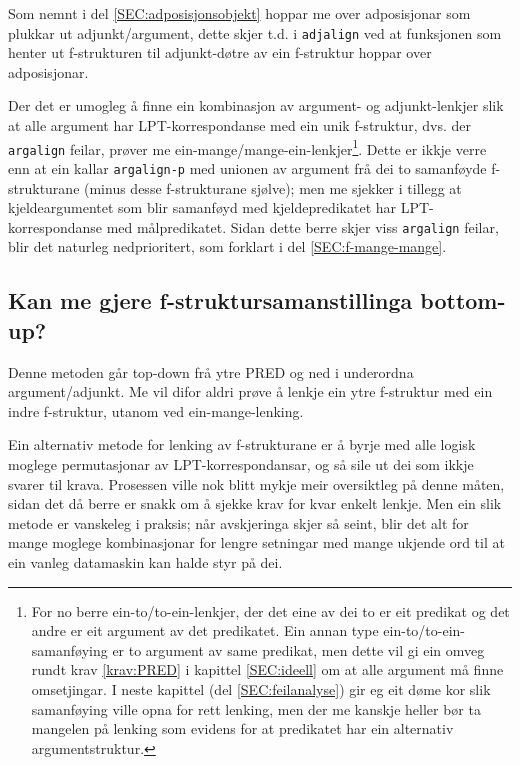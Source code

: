 \documentclass[12pt,a4paper,oneside,draft]{report}
\begin{document}
Som nemnt i del \ref{SEC:adposisjonsobjekt} hoppar me over
 adposisjonar som plukkar ut adjunkt/argument, dette skjer t.d. i
 \texttt{adjalign} ved at funksjonen som henter ut f\hyp{}strukturen til
 adjunkt-døtre av ein f\hyp{}struktur hoppar over adposisjonar.

Der det er umogleg å finne ein kombinasjon av argument- og
 adjunkt-lenkjer slik at alle argument har LPT\hyp{}korrespondanse med ein
 unik f\hyp{}struktur, dvs. der \texttt{argalign} feilar, prøver me
 ein-mange/mange-ein-lenkjer\footnote{For no berre ein-to/to-ein-lenkjer, der det eine av dei to er
        eit predikat og det andre er eit argument av det
        predikatet. Ein annan type ein-to/to-ein-samanføying er to
        argument av same predikat, men dette vil gi ein omveg rundt
        krav \ref{krav:PRED} i kapittel \ref{SEC:ideell} om at alle
        argument må finne omsetjingar. I neste kapittel (del
        \ref{SEC:feilanalyse}) gir eg eit døme kor slik samanføying
        ville opna for rett lenking, men der me kanskje heller bør ta
        mangelen på lenking som evidens for at predikatet har ein
        alternativ argumentstruktur. }. Dette er ikkje verre enn at ein
 kallar \texttt{argalign-p} med unionen av argument frå dei to samanføyde
 f\hyp{}strukturane (minus desse f\hyp{}strukturane sjølve); men me sjekker i
 tillegg at kjeldeargumentet som blir samanføyd med kjeldepredikatet
 har LPT\hyp{}korrespondanse med målpredikatet. Sidan dette berre skjer
 viss \texttt{argalign} feilar, blir det naturleg nedprioritert, som forklart
 i del \ref{SEC:f-mange-mange}.

\subsection{Kan me gjere f\hyp{}struktursamanstillinga bottom-up?}
\label{sec-4.1.3}


Denne metoden går top-down frå ytre PRED og ned i underordna
 argument/adjunkt. Me vil difor aldri prøve å lenkje ein ytre
 f\hyp{}struktur med ein indre f\hyp{}struktur, utanom ved ein-mange-lenking.

Ein alternativ metode for lenking av f\hyp{}strukturane er å byrje med
 alle logisk moglege permutasjonar av LPT\hyp{}korrespondansar, og så sile
 ut dei som ikkje svarer til krava. Prosessen ville nok blitt mykje
 meir oversiktleg på denne måten, sidan det då berre er snakk om å
 sjekke krav for kvar enkelt lenkje.  Men ein slik metode er vanskeleg
 i praksis; når avskjeringa skjer så seint, blir det alt for mange
 moglege kombinasjonar for lengre setningar med mange ukjende ord til
 at ein vanleg datamaskin kan halde styr på dei.
\end{document}
